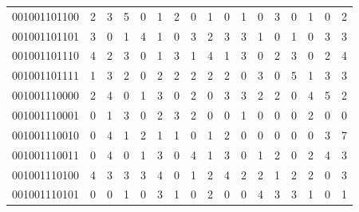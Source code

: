 \documentclass[10pt,a4paper]{article}
\begin{document}
\begin{longtable}{ |c|c|c|c|c|c|c|c|c|c|c|c|c|c|c|c|c| }
    001001101100              & 2                            & 3                                & 5                            & 0                              & 1   & 2   & 0   & 1   & 0   & 1   & 0   & 3   & 0   & 1   & 0   & 2   \\
    001001101101              & 3                            & 0                                & 1                            & 4                              & 1   & 0   & 3   & 2   & 3   & 3   & 1   & 0   & 1   & 0   & 3   & 3   \\
    001001101110              & 4                            & 2                                & 3                            & 0                              & 1   & 3   & 1   & 4   & 1   & 3   & 0   & 2   & 3   & 0   & 2   & 4   \\
    001001101111              & 1                            & 3                                & 2                            & 0                              & 2   & 2   & 2   & 2   & 2   & 0   & 3   & 0   & 5   & 1   & 3   & 3   \\
    001001110000              & 2                            & 4                                & 0                            & 1                              & 3   & 0   & 2   & 0   & 3   & 3   & 2   & 2   & 0   & 4   & 5   & 2   \\
    001001110001              & 0                            & 1                                & 3                            & 0                              & 2   & 3   & 2   & 0   & 0   & 1   & 0   & 0   & 0   & 2   & 0   & 0   \\
    001001110010              & 0                            & 4                                & 1                            & 2                              & 1   & 1   & 0   & 1   & 2   & 0   & 0   & 0   & 0   & 0   & 3   & 7   \\
    001001110011              & 0                            & 4                                & 0                            & 1                              & 3   & 0   & 4   & 1   & 3   & 0   & 1   & 2   & 0   & 2   & 4   & 3   \\
    001001110100              & 4                            & 3                                & 3                            & 3                              & 4   & 0   & 1   & 2   & 4   & 2   & 2   & 1   & 2   & 2   & 0   & 3   \\
    001001110101              & 0                            & 0                                & 1                            & 0                              & 3   & 1   & 0   & 2   & 0   & 0   & 4   & 3   & 3   & 1   & 0   & 1   \\

\end{longtable}
\end{document}

